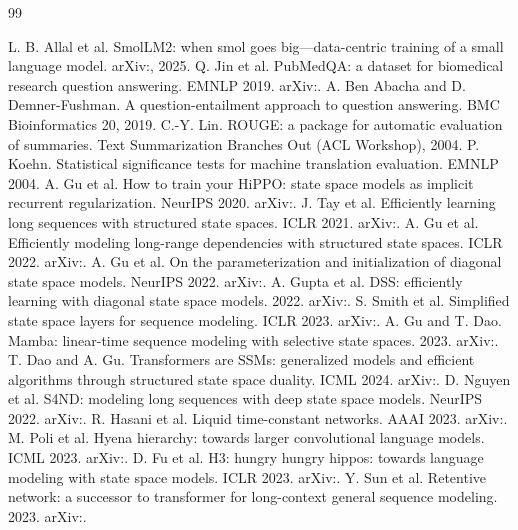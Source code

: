 \documentclass[11pt,a4paper]{article}
\theoremstyle{plain}
\theoremstyle{definition}
\theoremstyle{remark}
\begin{document}
\begin{thebibliography}{99}
\small

 L. B. Allal et al. SmolLM2: when smol goes big---data-centric training of a small language model. arXiv:, 2025.
 Q. Jin et al. PubMedQA: a dataset for biomedical research question answering. EMNLP 2019. arXiv:.
 A. Ben Abacha and D. Demner-Fushman. A question-entailment approach to question answering. BMC Bioinformatics 20, 2019.
 C.-Y. Lin. ROUGE: a package for automatic evaluation of summaries. Text Summarization Branches Out (ACL Workshop), 2004.
 P. Koehn. Statistical significance tests for machine translation evaluation. EMNLP 2004.
 A. Gu et al. How to train your HiPPO: state space models as implicit recurrent regularization. NeurIPS 2020. arXiv:.
 J. Tay et al. Efficiently learning long sequences with structured state spaces. ICLR 2021. arXiv:.
 A. Gu et al. Efficiently modeling long-range dependencies with structured state spaces. ICLR 2022. arXiv:.
 A. Gu et al. On the parameterization and initialization of diagonal state space models. NeurIPS 2022. arXiv:.
 A. Gupta et al. DSS: efficiently learning with diagonal state space models. 2022. arXiv:.
 S. Smith et al. Simplified state space layers for sequence modeling. ICLR 2023. arXiv:.
 A. Gu and T. Dao. Mamba: linear-time sequence modeling with selective state spaces. 2023. arXiv:.
 T. Dao and A. Gu. Transformers are SSMs: generalized models and efficient algorithms through structured state space duality. ICML 2024. arXiv:.
 D. Nguyen et al. S4ND: modeling long sequences with deep state space models. NeurIPS 2022. arXiv:.
 R. Hasani et al. Liquid time-constant networks. AAAI 2023. arXiv:.
 M. Poli et al. Hyena hierarchy: towards larger convolutional language models. ICML 2023. arXiv:.
 D. Fu et al. H3: hungry hungry hippos: towards language modeling with state space models. ICLR 2023. arXiv:.
 Y. Sun et al. Retentive network: a successor to transformer for long-context general sequence modeling. 2023. arXiv:.

\end{thebibliography}
\end{document}
